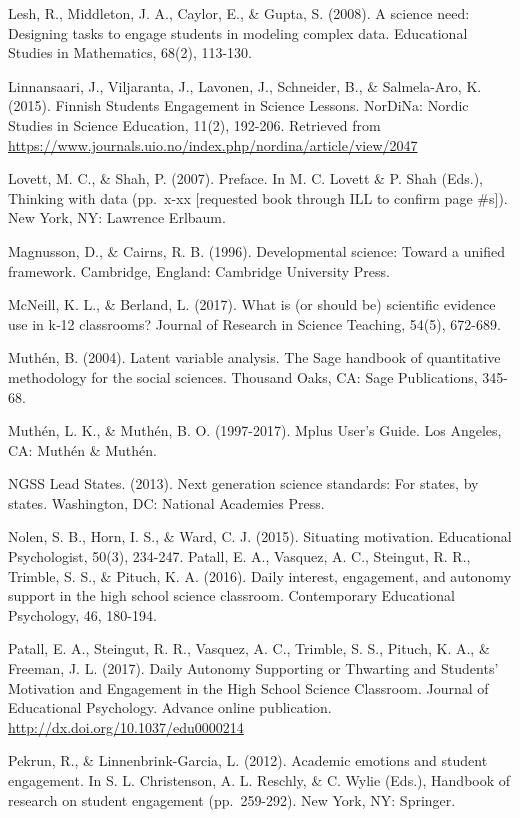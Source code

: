 \documentclass[]{book}
\theoremstyle{definition}
\theoremstyle{definition}
\theoremstyle{definition}
\theoremstyle{remark}
\begin{document}
Lesh, R., Middleton, J. A., Caylor, E., \& Gupta, S. (2008). A science
need: Designing tasks to engage students in modeling complex data.
Educational Studies in Mathematics, 68(2), 113-130.

Linnansaari, J., Viljaranta, J., Lavonen, J., Schneider, B., \&
Salmela-Aro, K. (2015). Finnish Students Engagement in Science Lessons.
NorDiNa: Nordic Studies in Science Education, 11(2), 192-206. Retrieved
from
\url{https://www.journals.uio.no/index.php/nordina/article/view/2047}

Lovett, M. C., \& Shah, P. (2007). Preface. In M. C. Lovett \& P. Shah
(Eds.), Thinking with data (pp.~x-xx {[}requested book through ILL to
confirm page \#s{]}). New York, NY: Lawrence Erlbaum.

Magnusson, D., \& Cairns, R. B. (1996). Developmental science: Toward a
unified framework. Cambridge, England: Cambridge University Press.

McNeill, K. L., \& Berland, L. (2017). What is (or should be) scientific
evidence use in k‐12 classrooms? Journal of Research in Science
Teaching, 54(5), 672-689.

Muthén, B. (2004). Latent variable analysis. The Sage handbook of
quantitative methodology for the social sciences. Thousand Oaks, CA:
Sage Publications, 345-68.

Muthén, L. K., \& Muthén, B. O. (1997-2017). Mplus User's Guide. Los
Angeles, CA: Muthén \& Muthén.

NGSS Lead States. (2013). Next generation science standards: For states,
by states. Washington, DC: National Academies Press.

Nolen, S. B., Horn, I. S., \& Ward, C. J. (2015). Situating motivation.
Educational Psychologist, 50(3), 234-247. Patall, E. A., Vasquez, A. C.,
Steingut, R. R., Trimble, S. S., \& Pituch, K. A. (2016). Daily
interest, engagement, and autonomy support in the high school science
classroom. Contemporary Educational Psychology, 46, 180-194.

Patall, E. A., Steingut, R. R., Vasquez, A. C., Trimble, S. S., Pituch,
K. A., \& Freeman, J. L. (2017). Daily Autonomy Supporting or Thwarting
and Students' Motivation and Engagement in the High School Science
Classroom. Journal of Educational Psychology. Advance online
publication. \url{http://dx.doi.org/10.1037/edu0000214}

Pekrun, R., \& Linnenbrink-Garcia, L. (2012). Academic emotions and
student engagement. In S. L. Christenson, A. L. Reschly, \& C. Wylie
(Eds.), Handbook of research on student engagement (pp.~259-292). New
York, NY: Springer.
\end{document}
